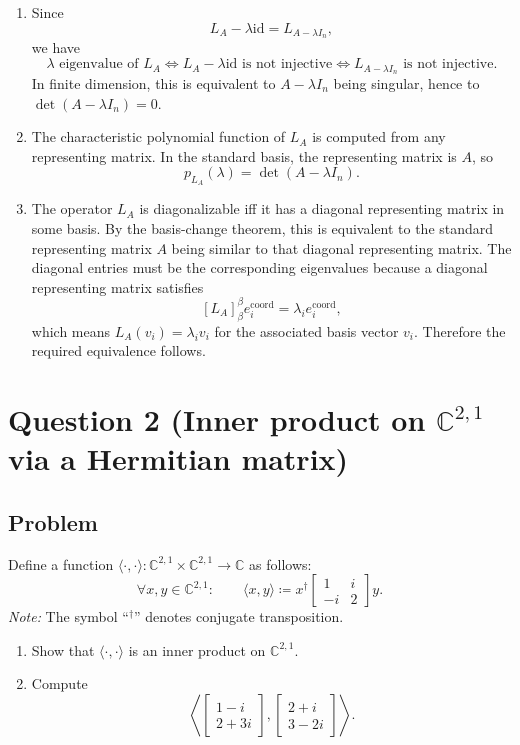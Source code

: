\documentclass[12pt]{article}
\newcommand{\df}{\coloneqq}
\newcommand{\C}{\mathbb{C}}
\newcommand{\Id}{\mathrm{id}}
\begin{document}
\begin{enumerate}[label=(\alph*)]
\item Since
\[
L_A-\lambda\Id=L_{A-\lambda I_n},
\]
we have
\[
\lambda\text{ eigenvalue of }L_A
\Longleftrightarrow
L_A-\lambda\Id\text{ is not injective}
\Longleftrightarrow
L_{A-\lambda I_n}\text{ is not injective}.
\]
In finite dimension, this is equivalent to $A-\lambda I_n$ being singular, hence to $\det(A-\lambda I_n)=0$.

\item The characteristic polynomial function of $L_A$ is computed from any representing matrix. In the standard basis, the representing matrix is $A$, so
\[
p_{L_A}(\lambda)=\det(A-\lambda I_n).
\]

\item The operator $L_A$ is diagonalizable iff it has a diagonal representing matrix in some basis. By the basis-change theorem, this is equivalent to the standard representing matrix $A$ being similar to that diagonal representing matrix. The diagonal entries must be the corresponding eigenvalues because a diagonal representing matrix satisfies
\[
[L_A]_{\beta}^{\beta}e_i^{\mathrm{coord}}=\lambda_i e_i^{\mathrm{coord}},
\]
which means $L_A(v_i)=\lambda_i v_i$ for the associated basis vector $v_i$. Therefore the required equivalence follows.
\end{enumerate}

\newpage
\section{Question 2 (Inner product on $\C^{2,1}$ via a Hermitian matrix)}
\subsection{Problem}
Define a function $\langle\cdot,\cdot\rangle : \C^{2,1}\times \C^{2,1}\to \C$ as follows:
\[
\forall x,y\in \C^{2,1}:\qquad
\langle x,y\rangle \df x^{\dagger}
\begin{bmatrix}
1 & i\\
-i & 2
\end{bmatrix}
y.
\]
\textit{Note:} The symbol ``${}^\dagger$'' denotes conjugate transposition.
\begin{enumerate}[label=(\alph*)]
\item Show that $\langle\cdot,\cdot\rangle$ is an inner product on $\C^{2,1}$.
\item Compute
\[
\left\langle
\begin{bmatrix}1-i\\ 2+3i\end{bmatrix},
\begin{bmatrix}2+i\\ 3-2i\end{bmatrix}
\right\rangle.
\]
\end{enumerate}
\end{document}
